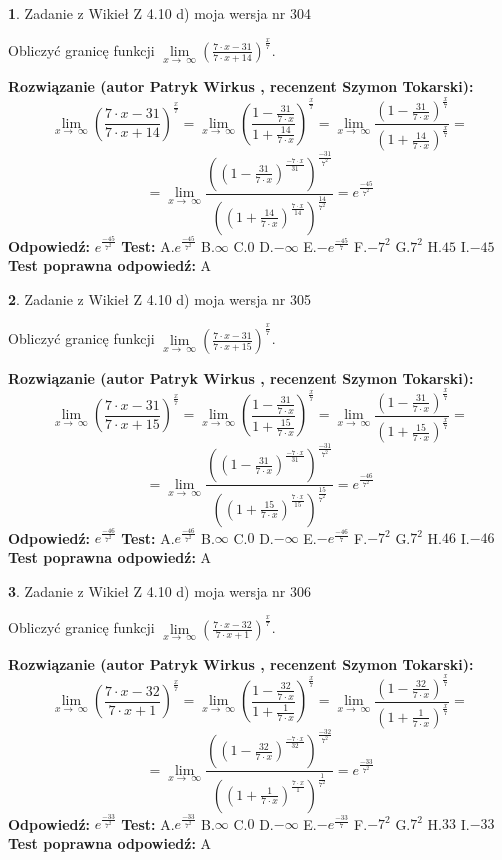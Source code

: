 \documentclass[12pt, a4paper]{article}
\theoremstyle{definition} %
\newtheorem{zad}{}
\newcommand{\zadStart}[1]{\begin{zad}#1\newline}
\newcommand{\zadStop}{\end{zad}}
\newcommand{\rozwStart}[2]{\noindent \textbf{Rozwiązanie (autor #1 , recenzent #2): }\newline}
\newcommand{\rozwStop}{\newline}
\newcommand{\odpStart}{\noindent \textbf{Odpowiedź:}\newline}
\newcommand{\odpStop}{\newline}
\newcommand{\testStart}{\noindent \textbf{Test:}\newline}
\newcommand{\testStop}{\newline}
\newcommand{\kluczStart}{\noindent \textbf{Test poprawna odpowiedź:}\newline}
\newcommand{\kluczStop}{\newline}
\begin{document}
\zadStart{Zadanie z Wikieł Z 4.10 d) moja wersja nr 304}


Obliczyć granicę funkcji  $\lim\limits_{x\to\ \infty}(\frac{7\cdot x-31}{7\cdot x+14})^{\frac{x}{7}}$.
\zadStop
\rozwStart{Patryk Wirkus}{Szymon Tokarski}
$$\lim\limits_{x\to\ \infty}(\frac{7\cdot x-31}{7\cdot x+14})^{\frac{x}{7}} = \lim\limits_{x\to\ \infty}(\frac{1-\frac{31}{7\cdot x}}{1+\frac{14}{7\cdot x}})^{\frac{x}{7}}=\lim\limits_{x\to\ \infty}\frac{(1-\frac{31}{7\cdot x})^{\frac{x}{7}}}{(1+\frac{14}{7\cdot x})^{\frac{x}{7}}}=$$
$$=\lim\limits_{x\to\ \infty}\frac{((1-\frac{31}{7\cdot x})^{\frac{-7\cdot x}{31}})^{\frac{-31}{7^{2}}}}{((1+\frac{14}{7\cdot x})^{\frac{7\cdot x}{14}})^{\frac{14}{7^{2}}}}=e^{\frac{-45}{7^{2}}}$$
\rozwStop
\odpStart
$e^{\frac{-45}{7^{2}}}$
\odpStop
\testStart
A.$e^{\frac{-45}{7^{2}}}$ B.$\infty$ C.$0$ D.$-\infty$ E.$-e^{\frac{-45}{7}}$
F.$-7^{2}$ G.$7^{2}$
H.$45$
I.$-45$
\testStop
\kluczStart
A
\kluczStop



\zadStart{Zadanie z Wikieł Z 4.10 d) moja wersja nr 305}


Obliczyć granicę funkcji  $\lim\limits_{x\to\ \infty}(\frac{7\cdot x-31}{7\cdot x+15})^{\frac{x}{7}}$.
\zadStop
\rozwStart{Patryk Wirkus}{Szymon Tokarski}
$$\lim\limits_{x\to\ \infty}(\frac{7\cdot x-31}{7\cdot x+15})^{\frac{x}{7}} = \lim\limits_{x\to\ \infty}(\frac{1-\frac{31}{7\cdot x}}{1+\frac{15}{7\cdot x}})^{\frac{x}{7}}=\lim\limits_{x\to\ \infty}\frac{(1-\frac{31}{7\cdot x})^{\frac{x}{7}}}{(1+\frac{15}{7\cdot x})^{\frac{x}{7}}}=$$
$$=\lim\limits_{x\to\ \infty}\frac{((1-\frac{31}{7\cdot x})^{\frac{-7\cdot x}{31}})^{\frac{-31}{7^{2}}}}{((1+\frac{15}{7\cdot x})^{\frac{7\cdot x}{15}})^{\frac{15}{7^{2}}}}=e^{\frac{-46}{7^{2}}}$$
\rozwStop
\odpStart
$e^{\frac{-46}{7^{2}}}$
\odpStop
\testStart
A.$e^{\frac{-46}{7^{2}}}$ B.$\infty$ C.$0$ D.$-\infty$ E.$-e^{\frac{-46}{7}}$
F.$-7^{2}$ G.$7^{2}$
H.$46$
I.$-46$
\testStop
\kluczStart
A
\kluczStop



\zadStart{Zadanie z Wikieł Z 4.10 d) moja wersja nr 306}


Obliczyć granicę funkcji  $\lim\limits_{x\to\ \infty}(\frac{7\cdot x-32}{7\cdot x+1})^{\frac{x}{7}}$.
\zadStop
\rozwStart{Patryk Wirkus}{Szymon Tokarski}
$$\lim\limits_{x\to\ \infty}(\frac{7\cdot x-32}{7\cdot x+1})^{\frac{x}{7}} = \lim\limits_{x\to\ \infty}(\frac{1-\frac{32}{7\cdot x}}{1+\frac{1}{7\cdot x}})^{\frac{x}{7}}=\lim\limits_{x\to\ \infty}\frac{(1-\frac{32}{7\cdot x})^{\frac{x}{7}}}{(1+\frac{1}{7\cdot x})^{\frac{x}{7}}}=$$
$$=\lim\limits_{x\to\ \infty}\frac{((1-\frac{32}{7\cdot x})^{\frac{-7\cdot x}{32}})^{\frac{-32}{7^{2}}}}{((1+\frac{1}{7\cdot x})^{\frac{7\cdot x}{1}})^{\frac{1}{7^{2}}}}=e^{\frac{-33}{7^{2}}}$$
\rozwStop
\odpStart
$e^{\frac{-33}{7^{2}}}$
\odpStop
\testStart
A.$e^{\frac{-33}{7^{2}}}$ B.$\infty$ C.$0$ D.$-\infty$ E.$-e^{\frac{-33}{7}}$
F.$-7^{2}$ G.$7^{2}$
H.$33$
I.$-33$
\testStop
\kluczStart
A
\kluczStop
\end{document}
